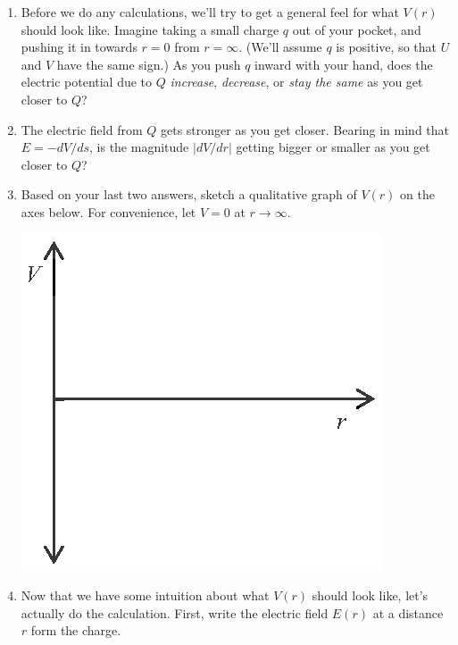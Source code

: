 \begin{enumerate}[wide, label=(\emph{\alph*})]

\item Before we do any calculations, we'll try to get a general feel for what $V(r)$ should look like.  Imagine taking a small charge $q$ out of your pocket, and pushing it in towards $r=0$ from $r=\infty$.  (We'll assume $q$ is positive, so that $U$ and $V$ have the same sign.)  As you push $q$ inward with your hand, does the electric potential due to $Q$ \textit{increase}, \textit{decrease}, or \textit{stay the same} as you get closer to $Q$?
\answerspace{0.4in}

\item The electric field from $Q$ gets stronger as you get closer.  Bearing in mind that $E = -dV/ds$, is the magnitude $\left | {dV}/{dr}\right |$ getting bigger or smaller as you get closer to $Q$?
\answerspace{0.4in}

\item Based on your last two answers, sketch a qualitative graph of $V(r)$ on the axes below.  For convenience, let $V=0$ at $r \rightarrow \infty$. \label{part_potential_intro_sketch_of_Vr}
\begin{center}
\includegraphics{potential_intro/activity_6_figs/V_axes.eps}
\end{center}

\pagebreak[2]
\item Now that we have some intuition about what $V(r)$ should look like, let's actually do the calculation.  First, write the electric field $E(r)$ at a distance $r$ form the charge.
\answerspace{0.5in}


\end{enumerate}
